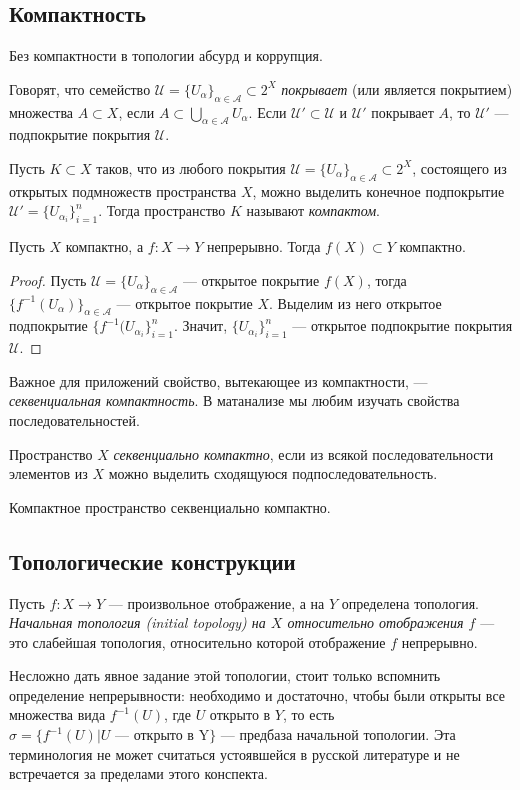 \subsection{Компактность}
Без компактности в топологии абсурд и коррупция.
\begin{defin}
	Говорят, что семейство $\mathcal{U}=\{U_{\alpha}\}_{\alpha\in\mathcal{A}}\subset 2^X$ \textit{покрывает} (или является покрытием) множества $A\subset X$, если $A\subset\bigcup\limits_{\alpha\in\mathcal{A}} U_{\alpha}$. Если $\mathcal{U}'\subset\mathcal{U}$ и $\mathcal{U}'$ покрывает $A$, то $\mathcal{U}'$ --- подпокрытие покрытия $\mathcal{U}$.
\end{defin}
\begin{defin}
	Пусть $K\subset X$ таков, что из любого покрытия $\mathcal{U}=\{U_{\alpha}\}_{\alpha\in\mathcal{A}}\subset 2^X$, состоящего из открытых подмножеств пространства $X$, можно выделить конечное подпокрытие $\mathcal{U}'=\{U_{\alpha_i}\}_{i=1}^n$. Тогда пространство $K$ называют \textit{компактом}.
\end{defin}
\begin{prop}
	Пусть $X$ компактно, а $f\colon X\to Y$ непрерывно. Тогда $f(X)\subset Y$ компактно.
\end{prop}
\begin{proof}
	Пусть $\mathcal{U}=\{U_{\alpha}\}_{\alpha\in\mathcal{A}}$ --- открытое покрытие $f(X)$, тогда $\{f^{-1}(U_{\alpha})\}_{\alpha\in\mathcal{A}}$ --- открытое покрытие $X$. Выделим из него открытое подпокрытие $\{f^{-1}(U_{\alpha_i}\}_{i=1}^n$. Значит, $\{U_{\alpha_i}\}_{i=1}^n$ --- открытое подпокрытие покрытия $\mathcal{U}$.
\end{proof}

Важное для приложений свойство, вытекающее из компактности, --- \textit{секвенциальная компактность}. В матанализе мы любим изучать свойства последовательностей.
\begin{defin}
	Пространство $X$ \textit{секвенциально компактно}, если из всякой последовательности элементов из $X$ можно выделить сходящуюся подпоследовательность.
\end{defin}
\begin{prop}
	Компактное пространство секвенциально компактно.
\end{prop}

\subsection{Топологические конструкции}
\begin{defin}
	Пусть $f\colon X\to Y$ --- произвольное отображение, а на $Y$ определена топология. \textit{Начальная топология (initial topology) на $X$ относительно отображения $f$} --- это слабейшая топология, относительно которой отображение $f$ непрерывно.
\end{defin}
Несложно дать явное задание этой топологии, стоит только вспомнить определение непрерывности: необходимо и достаточно, чтобы были открыты все множества вида $f^{-1}(U)$, где $U$ открыто в $Y$, то есть $\sigma=\{f^{-1}(U)|U\text{ --- открыто в Y}\}$ --- предбаза начальной топологии. Эта терминология не может считаться устоявшейся в русской литературе и не встречается за пределами этого конспекта.

